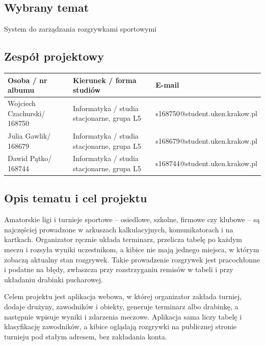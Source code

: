\documentclass[11pt,a4paper,oneside]{article}
\newif\ifpodpowiedzi
\newcommand{\podpowiedz}[1]{\ifpodpowiedzi\par\begingroup\small\color{hintcolor}\textit{Wskazówka: #1}\par\endgroup\fi}
\newcommand{\tytulprojektu}{System do zarządzania rozgrywkami sportowymi}
\newcommand{\studentA}{Wojciech Czachurski}
\newcommand{\studentB}{Julia Gawlik}
\newcommand{\studentC}{Dawid Pątko}
\newcommand{\albumA}{168750}
\newcommand{\albumB}{168679}
\newcommand{\albumC}{168744}
\begin{document}
\subsection{Wybrany temat}
\podpowiedz{Podaj uzgodniony tytuł projektu, zgodny ze stroną tytułową. Powinien wskazywać przedmiot i cel pracy.}
\tytulprojektu

\subsection{Zespół projektowy}
\podpowiedz{Podaj dane wszystkich członków zespołu. Zespół jest co do zasady trzyosobowy; w wyjątkowych, uzasadnionych przypadkach, za zgodą dyrekcji instytutu, może być dwuosobowy. W takim przypadku usuń dane trzeciej osoby ze strony tytułowej i tabeli.}
\begin{tabularx}{\textwidth}{@{}Y Y Y@{}}
\toprule
Osoba / nr albumu & Kierunek / forma studiów & E-mail\\
\midrule
\studentA / \albumA & Informatyka / studia stacjonarne, grupa L5 & \small s168750@student.uken.krakow.pl\\
\studentB / \albumB & Informatyka / studia stacjonarne, grupa L5 & \small s168679@student.uken.krakow.pl\\
\studentC / \albumC & Informatyka / studia stacjonarne, grupa L5 & \small s168744@student.uken.krakow.pl\\
\bottomrule
\end{tabularx}
\newpage
\subsection{Opis tematu i cel projektu}
\podpowiedz{Opisz problem, odbiorców i zamierzony rezultat. Jeśli korzystasz z opisu prowadzących, dostosuj go do uzgodnionego zakresu. Wyjaśnij, na czym polega praktyczny i inżynierski charakter pracy oraz po czym będzie można poznać, że cel został osiągnięty.}
Amatorskie ligi i turnieje sportowe -- osiedlowe, szkolne, firmowe czy klubowe -- są najczęściej prowadzone w arkuszach kalkulacyjnych, komunikatorach i na kartkach. Organizator ręcznie układa terminarz, przelicza tabelę po każdym meczu i rozsyła wyniki uczestnikom, a kibice nie mają jednego miejsca, w którym zobaczą aktualny stan rozgrywek. Takie prowadzenie rozgrywek jest pracochłonne i podatne na błędy, zwłaszcza przy rozstrzyganiu remisów w tabeli i przy układaniu drabinki pucharowej.

Celem projektu jest aplikacja webowa, w której organizator zakłada turniej, dodaje drużyny, zawodników i obiekty, generuje terminarz albo drabinkę, a następnie wpisuje wyniki i zdarzenia meczowe. Aplikacja sama liczy tabelę i klasyfikację zawodników, a kibice oglądają rozgrywki na publicznej stronie turnieju pod stałym adresem, bez zakładania konta.
\end{document}
